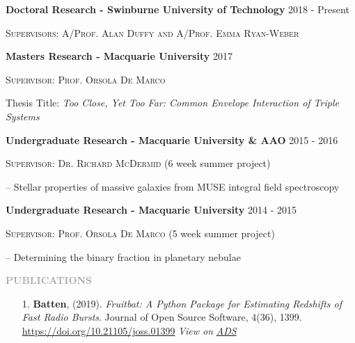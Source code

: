 \documentclass[11pt]{extarticle}
\def\Vhrulefill{{\color{BurntOrange}{\leavevmode\leaders\hrule height 1.2ex depth \dimexpr0.5pt-0.9ex\hfill\kern5pt}}}
\begin{document}
{\large \textbf{Doctoral Research - Swinburne University of Technology}} \hfill {\large 2018 - Present} \par
\textsc{Supervisors: A/Prof. Alan Duffy and A/Prof. Emma Ryan-Weber} \par
\vspace{2ex}

{\large \textbf{Masters Research - Macquarie University}} \hfill {\large 2017} \par
\textsc{Supervisor: Prof. Orsola De Marco} \par
Thesis Title: \emph{Too Close, Yet Too Far: Common Envelope Interaction of Triple Systems} \par
 \par
\vspace{2ex}

{\large \textbf{Undergraduate Research - Macquarie University \& AAO}} \hfill {\large 2015 - 2016} \par 
\textsc{Supervisor: Dr. Richard McDermid} (6 week summer project) \par 
\indent \indent -- Stellar properties of massive galaxies from MUSE integral field spectroscopy

\vspace{2ex}
{\large \textbf{Undergraduate Research - Macquarie University}} \hfill {\large 2014 - 2015} \par
\textsc{Supervisor: Prof. Orsola De Marco} (5 week summer project) \par
\indent \indent -- Determining the binary fraction in planetary nebulae

\par


\vspace{3ex}
\noindent
\textcolor{darkgray}{\Large\normalfont\bfseries\MakeUppercase{Publications}} \Vhrulefill
\vspace{2ex}

\begin{enumerate}
    \item[1.] \textbf{Batten}, (2019). \emph{Fruitbat: A Python Package for Estimating Redshifts of Fast Radio Bursts}. Journal of Open Source Software, 4(36), 1399. \href{https://doi.org/10.21105/joss.01399}{https://doi.org/10.21105/joss.01399} \emph{View on} \href{https://ui.adsabs.harvard.edu/abs/2019JOSS....4.1399B/abstract}{\emph{ADS}}
\end{enumerate}
\end{document}
